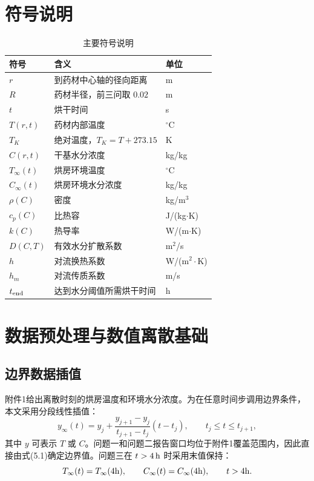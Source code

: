 \documentclass[UTF8,a4paper,12pt]{ctexart}
\numberwithin{equation}{section}
\begin{document}
\section{符号说明}
\begin{table}[H]
  \centering
  \caption{主要符号说明}
  \begin{tabular}{>{\centering\arraybackslash}p{}p{}>{\centering\arraybackslash}p{}}
    \toprule
    符号 & 含义 & 单位\\ \midrule
    $r$ & 到药材中心轴的径向距离 & m\\
    $R$ & 药材半径，前三问取 $0.02$ & m\\
    $t$ & 烘干时间 & s\\
    $T(r,t)$ & 药材内部温度 & $^\circ\mathrm C$\\
    $T_K$ & 绝对温度，$T_K=T+273.15$ & K\\
    $C(r,t)$ & 干基水分浓度 & kg/kg\\
    $T_\infty(t)$ & 烘房环境温度 & $^\circ\mathrm C$\\
    $C_\infty(t)$ & 烘房环境水分浓度 & kg/kg\\
    $\rho(C)$ & 密度 & kg/m$^3$\\
    $c_p(C)$ & 比热容 & J/(kg$\cdot$K)\\
    $k(C)$ & 热导率 & W/(m$\cdot$K)\\
    $D(C,T)$ & 有效水分扩散系数 & m$^2$/s\\
    $h$ & 对流换热系数 & W/(m$^2\cdot$K)\\
    $h_m$ & 对流传质系数 & m/s\\
    $t_{\rm end}$ & 达到水分阈值所需烘干时间 & h\\
    \bottomrule
  \end{tabular}
\end{table}

\section{数据预处理与数值离散基础}
\subsection{边界数据插值}
附件1给出离散时刻的烘房温度和环境水分浓度。为在任意时间步调用边界条件，本文采用分段线性插值：
\begin{equation}
  y_\infty(t)=y_j+\frac{y_{j+1}-y_j}{t_{j+1}-t_j}(t-t_j),
  \qquad t_j\le t\le t_{j+1},
\end{equation}
其中 $y$ 可表示 $T$ 或 $C$。问题一和问题二报告窗口均位于附件1覆盖范围内，因此直接由式(5.1)确定边界值。问题三在 $t>4\rm\,h$ 时采用末值保持：
\begin{equation}
  T_\infty(t)=T_\infty(4{\rm h}),\qquad C_\infty(t)=C_\infty(4{\rm h}),\qquad t>4{\rm h}.
\end{equation}
\end{document}
